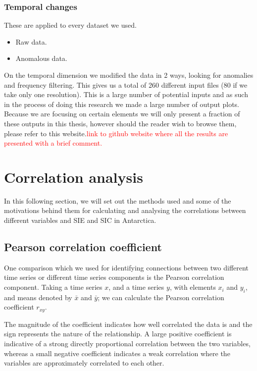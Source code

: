 \documentclass[../main.tex]{subfiles}
\begin{document}
\subsubsection*{Temporal changes}
These are applied to every dataset we used.
\begin{itemize}
    \item Raw data.
    \item Anomalous data.
\end{itemize}

On the temporal dimension we modified the data in 2 ways, looking for anomalies and frequency filtering. This gives us a total of 260 different input files (80 if we take only one resolution). This is a large number of potential inputs and as such in the process of doing this research we made a large number of output plots. Because we are focusing on certain elements we will only present a fraction of these outputs in this thesis, however should the reader wish to browse them, please refer to this website.\textcolor{red}{link to github website where all the results are presented with a brief comment.}


\section{Correlation analysis}
\label{Methods:pearson}

In this following section, we will set out the methods used and some of the motivations behind them for calculating and analysing the correlations between different variables and SIE and SIC in Antarctica.

\subsection{Pearson correlation coefficient}
One comparison which we used for identifying connections between two different time series or different time series components is the Pearson correlation component. Taking a time series $x$, and a time series $y$, with elements $x_i$ and $y_i$, and means denoted by $\bar{x}$ and $\bar{y}$; we can calculate the Pearson correlation coefficient $r_{xy}$.



The magnitude of the coefficient indicates how well correlated the data is and the sign represents the nature of the relationship. A large positive coefficient is indicative of a strong directly proportional correlation between the two variables, whereas a small negative coefficient indicates a weak correlation where the variables are approximately correlated to each other.
\end{document}
